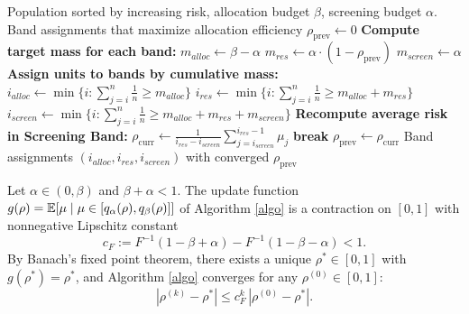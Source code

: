 \label{app:algorithm}
\begin{algorithm*}[ht]
  \caption{Fixed-Point Algorithm for Optimal Screening and Allocation Assignment}
  \label{algo}
  \begin{algorithmic}[1]
  \Require Population sorted by increasing risk, allocation budget $\beta$, screening budget $\alpha$.
  \Ensure Band assignments that maximize allocation efficiency
  \State $\rho_{\text{prev}} \gets 0$ 
      \State \textbf{Compute target mass for each band:}
      \State $m_{alloc} \gets \beta - \alpha$ 
      \State $m_{res} \gets \alpha \cdot (1 - \rho_{\text{prev}})$ 
      \State $m_{screen} \gets \alpha$ 
      \State
      \State \textbf{Assign units to bands by cumulative mass:}
      \State $i_{alloc} \gets \min\{i : \sum_{j=i}^{n} \frac{1}{n} \geq m_{alloc}\}$ 
      \State $i_{res} \gets \min\{i : \sum_{j=i}^{n} \frac{1}{n} \geq m_{alloc} + m_{res}\}$ 
      \State $i_{screen} \gets \min\{i : \sum_{j=i}^{n} \frac{1}{n} \geq m_{alloc} + m_{res} + m_{screen}\}$ 
      \State
      \State \textbf{Recompute average risk in Screening Band:}
      \State $\rho_{\text{curr}} \gets \frac{1}{i_{res} - i_{screen}} \sum_{j=i_{screen}}^{i_{res}-1} \mu_j$ 
      \State
          \State \textbf{break} 
      \EndIf
      \State $\rho_{\text{prev}} \gets \rho_{\text{curr}}$ 
  \EndFor
  \State
  \Return Band assignments $(i_{alloc}, i_{res}, i_{screen})$ with converged $\rho_{\text{prev}}$
  \end{algorithmic}
\end{algorithm*}

\begin{theorem}\label{thm:fixed_point}
    Let $\alpha \in (0, \beta)$ and $\beta + \alpha < 1$. The update function  $g(\rho) = \mathbb{E}[\mu \mid \mu \in [q_{\alpha}(\rho), q_{\beta}(\rho)]]$ of Algorithm \ref{algo} is a contraction on $[0, 1]$ with nonnegative Lipschitz constant
    $$c_F := F^{-1}(1-\beta+\alpha) - F^{-1}(1-\beta-\alpha) < 1.$$
    By Banach's fixed point theorem, there exists a unique $\rho^* \in [0,1]$ with $g(\rho^*) = \rho^*$, and Algorithm \ref{algo} converges for any $\rho^{(0)} \in [0,1]$:
    $$|\rho^{(k)} - \rho^*| \leq c_F^k\,|\rho^{(0)} - \rho^*|.$$
\end{theorem}


